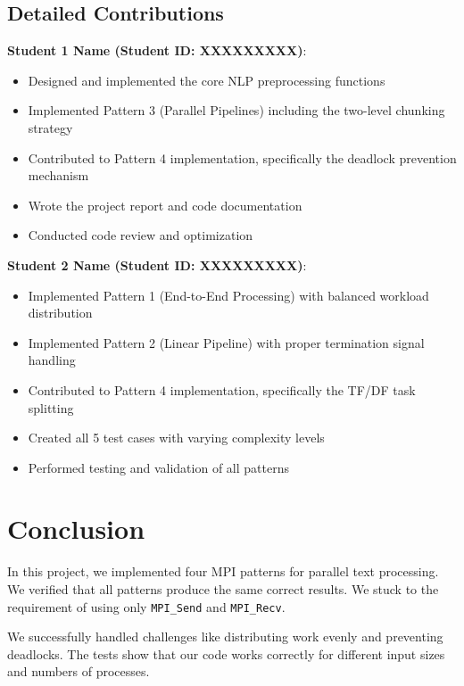 \documentclass[12pt,a4paper]{article}
\begin{document}
\subsection{Detailed Contributions}

\textbf{Student 1 Name (Student ID: XXXXXXXXX)}:
\begin{itemize}
    \item Designed and implemented the core NLP preprocessing functions
    \item Implemented Pattern 3 (Parallel Pipelines) including the two-level chunking strategy
    \item Contributed to Pattern 4 implementation, specifically the deadlock prevention mechanism
    \item Wrote the project report and code documentation
    \item Conducted code review and optimization
\end{itemize}

\textbf{Student 2 Name (Student ID: XXXXXXXXX)}:
\begin{itemize}
    \item Implemented Pattern 1 (End-to-End Processing) with balanced workload distribution
    \item Implemented Pattern 2 (Linear Pipeline) with proper termination signal handling
    \item Contributed to Pattern 4 implementation, specifically the TF/DF task splitting
    \item Created all 5 test cases with varying complexity levels
    \item Performed testing and validation of all patterns
\end{itemize}

\section{Conclusion}

In this project, we implemented four MPI patterns for parallel text processing. We verified that all patterns produce the same correct results. We stuck to the requirement of using only \texttt{MPI\_Send} and \texttt{MPI\_Recv}.

We successfully handled challenges like distributing work evenly and preventing deadlocks. The tests show that our code works correctly for different input sizes and numbers of processes.
\end{document}
